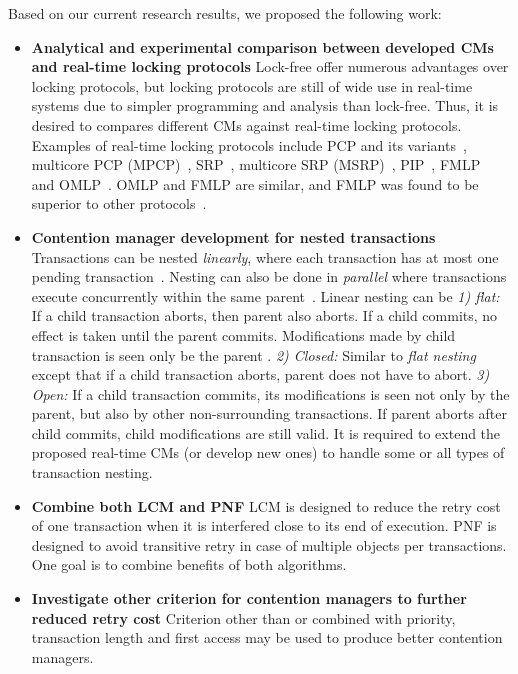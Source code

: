 \documentclass[12pt,english]{report}
\begin{document}
Based on our current research results, we proposed the following work:
\begin{itemize}

\item \textbf{Analytical and experimental comparison between developed CMs and real-time locking protocols}
Lock-free offer numerous advantages over locking protocols, but locking protocols are still of wide use in real-time systems due to simpler programming and analysis than lock-free. Thus, it is desired to compares different CMs against real-time locking protocols. Examples of real-time locking protocols include PCP and its variants~\cite{chen1990dynamic,6031129,Rajkumar:1991:SRS:532621,sha1990priority}, multicore PCP (MPCP)~\cite{lakshmanan2009coordinated,rajkumar2002real}, SRP~\cite{Buttazzo:2004:HRC:1027504, baker1991stack}, multicore SRP (MSRP)~\cite{gai2003comparison}, PIP~\cite{easwaran2009resource}, FMLP~\cite{key-4,brandenburg2008implementation,holman2006locking} and OMLP~\cite{Baruah:2007:TMG:1338441.1338647}. OMLP and FMLP are similar, and FMLP was found to be superior to other protocols~\cite{brandenburg2008comparison}.

\item \textbf{Contention manager development for nested transactions}
Transactions can be nested \textit{linearly}, where each transaction has at most one pending transaction~\cite{Moss2006186}. Nesting can also be done in \textit{parallel} where transactions execute concurrently within the same parent~\cite{volos2009nepaltm}. Linear nesting can be \textit{1) flat:} If a child transaction aborts, then parent also aborts. If a child commits, no effect is taken until the parent commits. Modifications made by child transaction is seen only be the parent . \textit{2) Closed:} Similar to \textit{flat nesting} except that if a child transaction aborts, parent does not have to abort. \textit{3) Open:} If a child transaction commits, its modifications is seen not only by the parent, but also by other non-surrounding transactions. If parent aborts after child commits, child modifications are still valid. It is required to extend the proposed real-time CMs (or develop new ones) to handle some or all types of transaction nesting.

\item \textbf{Combine both LCM and PNF} LCM is designed to reduce the retry cost of one transaction when it is interfered close to its end of execution. PNF is designed to avoid transitive retry in case of multiple objects per transactions. One goal is to combine benefits of both algorithms.

\item \textbf{Investigate other criterion for contention managers to further reduced retry cost} Criterion other than or combined with priority, transaction length and first access may be used to produce better contention managers.

\end{itemize}
\end{document}
